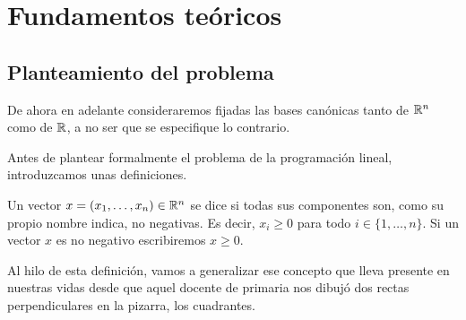 \chapter{Fundamentos teóricos}
\label{fund}
\section{Planteamiento del problema}
De ahora en adelante consideraremos fijadas las bases canónicas tanto de $\mathbb{R}^n$ como de $\mathbb{R}$, a no ser que se especifique lo contrario.

Antes de plantear formalmente el problema de la programación lineal, introduzcamos unas definiciones.

\begin{defi}
	Un vector $x=(x_1,\dots,x_n)\in\mathbb{R}^n$ se dice  si todas sus componentes son, como su propio nombre indica, no negativas. Es decir, $x_i\geq 0$ para todo $i\in\{1,\dots,n\}$. Si un vector $x$ es no negativo escribiremos $x\geq 0$.
\end{defi}
Al hilo de esta definición, vamos a generalizar ese concepto que lleva presente en nuestras vidas desde que aquel docente de primaria nos dibujó dos rectas perpendiculares en la pizarra, los cuadrantes.

